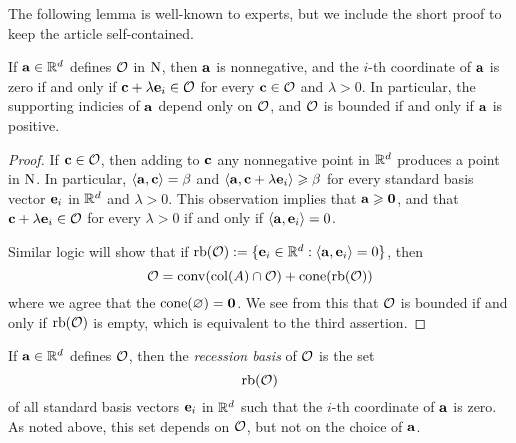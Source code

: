 \documentclass[11pt]{amsart}
\renewcommand{\!}[1]{{\color{red}\text{$\star$\,}#1\,$\star$}}
\begin{document}
The following lemma is well-known to experts, but we include the short proof to keep the article self-contained.

\begin{lemma} 
\label{face: L}
If $\mathbf{a} \in \mathbb{R}^d$ defines $\mathcal{O}$ in $\mathrm{N}$, then $\mathbf{a}$ is nonnegative, and the $i$-th coordinate of $\mathbf{a}$ is zero if and only if $\mathbf{c} + \lambda \mathbf{e}_i \in \mathcal{O}$  for every $\mathbf{c} \in \mathcal{O}$ and $\lambda > 0$.  In particular, the supporting indicies of $\mathbf{a}$ depend only on $\mathcal{O}$, and $\mathcal{O}$ is bounded if and only if $\mathbf{a}$ is positive. 
\end{lemma}

\begin{proof}  If $\mathbf{c} \in \mathcal{O}$, then adding to $\mathbf{c}$ any nonnegative point in $\mathbb{R}^d$ produces a point in $\mathrm{N}$.  In particular, $\langle \mathbf{a}, \mathbf{c} \rangle = \beta$ and $\langle \mathbf{a}, \mathbf{c} + \lambda \mathbf{e}_i \rangle \geqslant \beta$ for every standard basis vector $\mathbf{e}_i$ in $\mathbb{R}^d$ and $\lambda > 0$.  This observation implies that $\mathbf{a} \geqslant \mathbf{0}$, and that $\mathbf{c} + \lambda \mathbf{e}_i \in \mathcal{O}$ for every $\lambda > 0$ if and only if $\langle \mathbf{a}, \mathbf{e}_i \rangle = 0$.  

Similar logic will show that if $\operatorname{rb}(\mathcal{O}) := \{ \mathbf{e}_i \in \mathbb{R}^d : \langle \mathbf{a}, \mathbf{e}_i \rangle = 0\}$, then 
\begin{equation}
\label{face: e}
\mathcal{O} =  \operatorname{conv}( \operatorname{col}(A) \cap \mathcal{O} ) + \operatorname{cone}(\operatorname{rb}(\mathcal{O}))
\end{equation}
where we agree that the $\operatorname{cone}(\varnothing) = \mathbf{0}$.  We see from this that $\mathcal{O}$ is bounded if and only if $\operatorname{rb}(\mathcal{O})$ is empty, which is equivalent to the third assertion.  
\end{proof}

\begin{definition} If $\mathbf{a} \in \mathbb{R}^d$ defines $\mathcal{O}$, then the \emph{recession basis} of $\mathcal{O}$ is the set \[ \operatorname{rb}(\mathcal{O}) \] of all standard basis vectors $\mathbf{e}_i$ in $\mathbb{R}^d$ such that the $i$-th coordinate of $\mathbf{a}$ is zero.  As noted above, this set depends on $\mathcal{O}$, but not on the choice of $\mathbf{a}$.
\end{definition}

\end{document}
